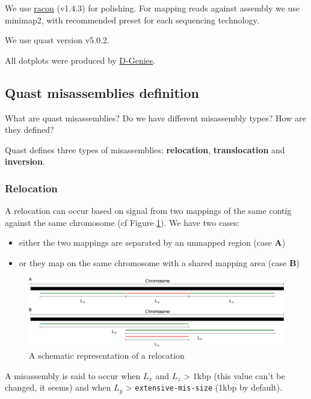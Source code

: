\documentclass[./main.tex]{subfiles}
\begin{document}
We use \href{https://github.com/lbcb-sci/racon}{racon} (v1.4.3) for
polishing. For mapping reads against assembly we use minimap2, with
recommended preset for each sequencing technology.

We use quast version v5.0.2.

All dotplots were produced by
\href{http://dgenies.toulouse.inra.fr/}{D-Genies}.

\subsection{Quast misassemblies definition}

What are quast misassemblies? Do we have different misassembly types?
How are they defined?

Quast defines three types of misassemblies: \textbf{relocation},
\textbf{translocation} and \textbf{inversion}.

\subsubsection{Relocation}

A relocation can occur based on signal from two mappings of the same
contig against the same chromosome (cf Figure \ref{relocation_def}). We have two cases:

\begin{itemize}
\item either the two mappings are separated by an unmapped region (case \textbf{A})
\item or they map on the same chromosome with a shared mapping area (case \textbf{B})
\end{itemize}

\begin{figure}[ht]
    \centering
    \includegraphics[width=\textwidth]{paper/misassemblies-in-noisy-assemblies/relocation_def.pdf}
    \caption{A schematic representation of a relocation}
    \label{relocation_def}
\end{figure}

A misassembly is said to occur when $L_x$ and $L_z$ \textgreater{}
1kbp (this value can't be changed, it seems) and when $L_y$
\textgreater{} \texttt{extensive-mis-size} (1kbp by default).
\end{document}
